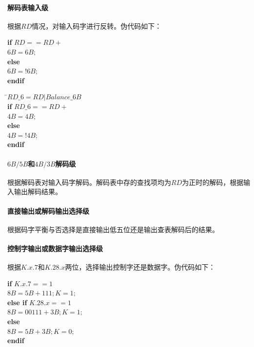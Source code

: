 \documentclass[UTF8]{ctexart}
\newcommand\kw{\textbf}
\begin{document}
\paragraph{解码表输入级}

根据$RD$情况，对输入码字进行反转。伪代码如下：

\begin{tabbing}
\qquad\=\kw{if} $RD==RD+$ \\
      \>\qquad$6B=6B;$ \\
      \>\kw{else} \\
      \>\qquad$6B=!6B;$ \\
      \>\kw{endif}
\end{tabbing}

\begin{tabbing}
\qquad\=$RD\_6=RD|Balance\_6B$ \\
      \>\kw{if} $RD\_6==RD+$ \\
      \>\qquad$4B=4B;$ \\
      \>\kw{else} \\
      \>\qquad$4B=!4B;$ \\
      \>\kw{endif}
\end{tabbing}

\paragraph{$6B/5B$和$4B/3B$解码级}

根据解码表对输入码字解码。解码表中存的查找项均为$RD$为正时的解码，根据输入输出解码结果。

\paragraph{直接输出或解码输出选择级}

根据码字平衡与否选择是直接输出低五位还是输出查表解码后的结果。

\paragraph{控制字输出或数据字输出选择级}

根据$K.x.7$和$K.28.x$两位，选择输出控制字还是数据字。伪代码如下：

\begin{tabbing}
\qquad\=\kw{if} $K.x.7==1$ \\
      \>\qquad$8B=5B+111;K=1;$ \\
      \>\kw{else if} $K.28.x==1$ \\
      \>\qquad$8B=00111+3B;K=1;$ \\
      \>\kw{else} \\
      \>\qquad$8B=5B+3B;K=0;$ \\
      \>\kw{endif}
\end{tabbing}
\end{document}
